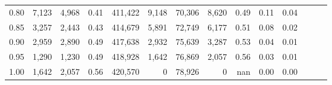 \begin{tabular}{rrrrrrrrrrrrrr}
0.80 &   7,123 &  4,968 &  0.41 &  411,422 &    9,148 &  70,306 &   8,620 &  0.49 &  0.11 &      0.04 \\
0.85 &   3,257 &  2,443 &  0.43 &  414,679 &    5,891 &  72,749 &   6,177 &  0.51 &  0.08 &      0.02 \\
0.90 &   2,959 &  2,890 &  0.49 &  417,638 &    2,932 &  75,639 &   3,287 &  0.53 &  0.04 &      0.01 \\
0.95 &   1,290 &  1,230 &  0.49 &  418,928 &    1,642 &  76,869 &   2,057 &  0.56 &  0.03 &      0.01 \\
1.00 &   1,642 &  2,057 &  0.56 &  420,570 &        0 &  78,926 &       0 &   nan &  0.00 &      0.00 \\
\bottomrule
\end{tabular}
